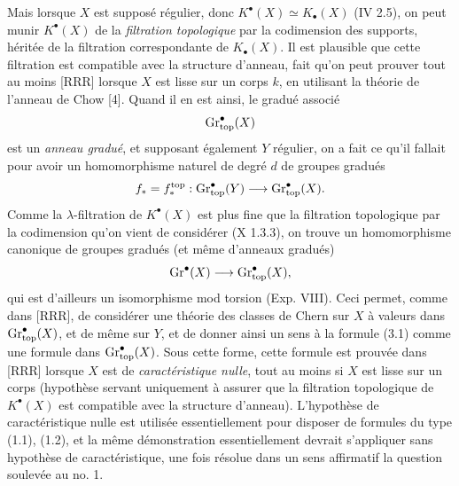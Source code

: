 Mais lorsque $X$ est supposé régulier, donc $K^\bullet(X)\simeq K_\bullet(X)$ (IV 2.5), on peut munir $K^\bullet(X)$ de la \emph{filtration topologique} par la codimension des supports, héritée de la filtration correspondante de $K_\bullet(X)$. Il est plausible que cette filtration est compatible avec la structure d'anneau, fait qu'on peut prouver tout au moins [RRR] lorsque $X$ est lisse sur un corps $k$, en utilisant la théorie de l'anneau de Chow [4]. Quand il en est ainsi, le gradué associé
\[
 \operatorname{Gr}_{\mathrm{top}}^\bullet(X)
\]
est un \emph{anneau gradué}, et supposant également $Y$ régulier, on a fait ce qu'il fallait pour avoir un homomorphisme naturel de degré $d$ de groupes gradués
\[
 f_*=f_*^{\mathrm{top}}:\operatorname{Gr}_{\mathrm{top}}^\bullet(Y)\longrightarrow \operatorname{Gr}_{\mathrm{top}}^\bullet(X).
\]
Comme la $\lambda$-filtration de $K^\bullet(X)$ est plus fine que la filtration topologique par la codimension qu'on vient de considérer (X 1.3.3), on trouve un homomorphisme canonique de groupes gradués (et même d'anneaux gradués)
\[
 \operatorname{Gr}^\bullet(X)\longrightarrow \operatorname{Gr}_{\mathrm{top}}^\bullet(X),
\]
qui est d'ailleurs un isomorphisme mod torsion (Exp. VIII). Ceci permet, comme dans [RRR], de considérer une théorie des classes de Chern sur $X$ à valeurs dans $\operatorname{Gr}_{\mathrm{top}}^\bullet(X)$, et de même sur $Y$, et de donner ainsi un sens à la formule (3.1) comme une formule dans $\operatorname{Gr}_{\mathrm{top}}^\bullet(X)$. Sous cette forme, cette formule est prouvée dans [RRR] lorsque $X$ est de \emph{caractéristique nulle}, tout au moins si $X$ est lisse sur un corps (hypothèse servant uniquement à assurer que la filtration topologique de $K^\bullet(X)$ est compatible avec la structure d'anneau). L'hypothèse de caractéristique nulle est utilisée
essentiellement pour disposer de formules du type (1.1), (1.2), et la même démonstration essentiellement devrait s'appliquer sans hypothèse de caractéristique, une fois résolue dans un sens affirmatif la question soulevée au no. 1.

